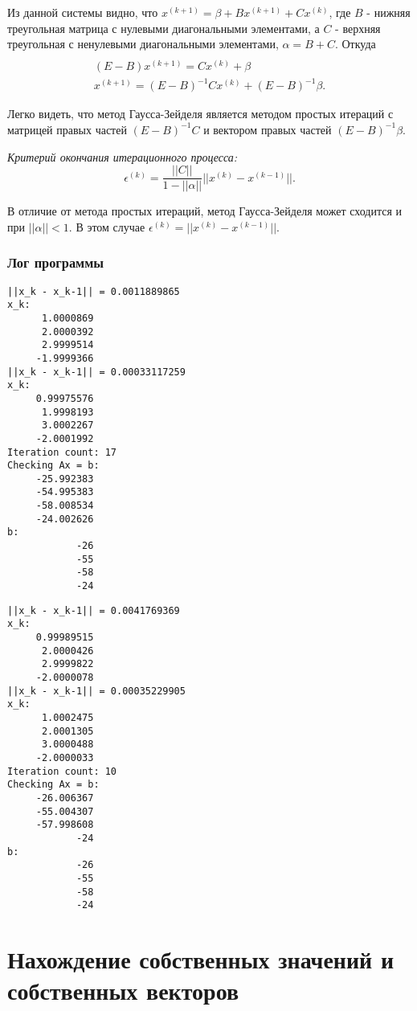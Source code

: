 \documentclass[a4paper,12pt]{article}
\begin{document}
Из данной системы видно, что $x^{(k + 1)} = \beta + B x^{(k + 1)}
+ Cx^{(k)}$, где $B$ - нижняя треугольная матрица
с нулевыми диагональными элементами, а $C$ - верхняя
треугольная с ненулевыми диагональными элементами,
$\alpha = B + C$. Откуда
\begin{multline}
\\
(E - B)x^{(k + 1)} = Cx^{(k)} + \beta \\
x^{(k + 1)} = (E - B)^{-1}Cx^{(k)} + (E - B)^{-1}\beta.
\end{multline}

Легко видеть, что метод Гаусса-Зейделя является методом простых
итераций с матрицей правых частей $(E - B)^{-1}C$ и вектором
правых частей $(E - B)^{-1}\beta$.

\textit{Критерий окончания итерационного процесса:}
$$
\epsilon^{(k)} = \frac{||C||}{1 - ||\alpha||} ||x^{(k)} - x^{(k - 1)}||.
$$

В отличие от метода простых итераций, метод Гаусса-Зейделя
может сходится и при $||\alpha|| < 1$. В этом случае
$\epsilon^{(k)} = ||x^{(k)} - x^{(k - 1)}||$.

\subsubsection{Лог программы}
\begin{verbatim}
||x_k - x_k-1|| = 0.0011889865
x_k:
      1.0000869
      2.0000392
      2.9999514
     -1.9999366
||x_k - x_k-1|| = 0.00033117259
x_k:
     0.99975576
      1.9998193
      3.0002267
     -2.0001992
Iteration count: 17
Checking Ax = b:
     -25.992383
     -54.995383
     -58.008534
     -24.002626
b:
            -26
            -55
            -58
            -24
\end{verbatim}

\begin{verbatim}
||x_k - x_k-1|| = 0.0041769369
x_k:
     0.99989515
      2.0000426
      2.9999822
     -2.0000078
||x_k - x_k-1|| = 0.00035229905
x_k:
      1.0002475
      2.0001305
      3.0000488
     -2.0000033
Iteration count: 10
Checking Ax = b:
     -26.006367
     -55.004307
     -57.998608
            -24
b:
            -26
            -55
            -58
            -24
\end{verbatim}

\newpage

\section{Нахождение собственных значений и собственных векторов}
\end{document}
